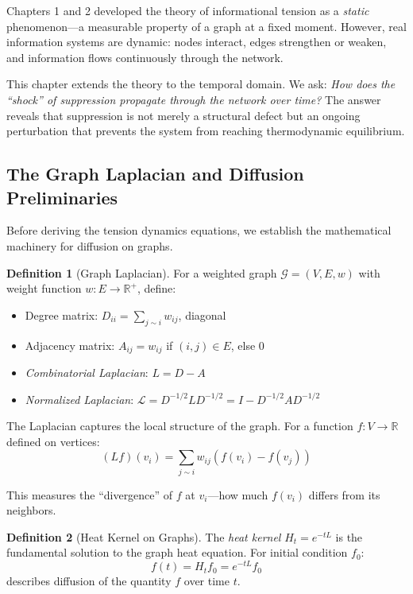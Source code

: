 \documentclass[12pt,a4paper]{article}
\theoremstyle{definition}
\newtheorem{definition}{Definition}[section]
\theoremstyle{remark}
\newcommand{\Real}{\mathbb{R}}           %
\newcommand{\Graph}{\mathcal{G}}         %
\begin{document}
Chapters 1 and 2 developed the theory of informational tension as a \emph{static} phenomenon—a measurable property of a graph at a fixed moment. However, real information systems are dynamic: nodes interact, edges strengthen or weaken, and information flows continuously through the network.

This chapter extends the theory to the temporal domain. We ask: \emph{How does the ``shock'' of suppression propagate through the network over time?} The answer reveals that suppression is not merely a structural defect but an ongoing perturbation that prevents the system from reaching thermodynamic equilibrium.

\subsection{The Graph Laplacian and Diffusion Preliminaries}

Before deriving the tension dynamics equations, we establish the mathematical machinery for diffusion on graphs.

\begin{definition}[Graph Laplacian]
For a weighted graph $\Graph = (V, E, w)$ with weight function $w: E \to \Real^+$, define:
\begin{itemize}
    \item Degree matrix: $D_{ii} = \sum_{j \sim i} w_{ij}$, diagonal
    \item Adjacency matrix: $A_{ij} = w_{ij}$ if $(i,j) \in E$, else $0$
    \item \emph{Combinatorial Laplacian}: $L = D - A$
    \item \emph{Normalized Laplacian}: $\mathcal{L} = D^{-1/2} L D^{-1/2} = I - D^{-1/2} A D^{-1/2}$
\end{itemize}
\end{definition}

The Laplacian captures the local structure of the graph. For a function $f: V \to \Real$ defined on vertices:
\begin{equation}
    (Lf)(v_i) = \sum_{j \sim i} w_{ij} \left( f(v_i) - f(v_j) \right)
\end{equation}

This measures the ``divergence'' of $f$ at $v_i$—how much $f(v_i)$ differs from its neighbors.

\begin{definition}[Heat Kernel on Graphs]
The \emph{heat kernel} $H_t = e^{-tL}$ is the fundamental solution to the graph heat equation. For initial condition $f_0$:
\begin{equation}
    f(t) = H_t f_0 = e^{-tL} f_0
\end{equation}
describes diffusion of the quantity $f$ over time $t$.
\end{definition}
\end{document}
